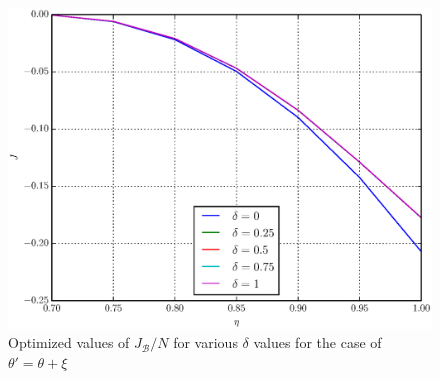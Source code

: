 \documentclass[%
master,         %
subf,           %
href,           %
colorlinks=true %
]{disser}
\numberwithin{equation}{section}
\numberwithin{figure}{section}
\begin{document}
\begin{figure}[t]
\includegraphics[scale=0.7]{J_ang.eps}
\caption{Optimized values of $J_{\mathcal{B}}/N$ for various $\delta$ values for the case of $\theta' = \theta + \xi$}
\label{fig:J_ang}
\end{figure}


\begingroup
\small
\end{document}
